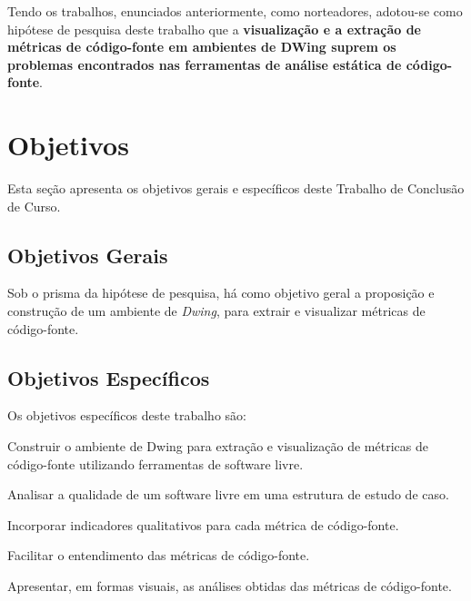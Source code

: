 Tendo os trabalhos, enunciados anteriormente, como norteadores, adotou-se como 
hipótese de pesquisa deste trabalho que a \textbf{visualização
e a extração de métricas de código-fonte em ambientes de DWing suprem 
os problemas encontrados nas ferramentas de análise estática de código-fonte}.








\section{Objetivos}

Esta seção apresenta os objetivos gerais e específicos deste Trabalho de 
Conclusão de Curso.

\subsection{Objetivos Gerais}
Sob o prisma da hipótese de pesquisa, há como objetivo geral a proposição e 
construção  de um ambiente de \textit{Dwing}, para extrair e visualizar métricas
 de código-fonte.



\subsection{Objetivos Específicos}

Os objetivos específicos deste trabalho são:


\begin{objectives}
	\item Construir o ambiente de Dwing para extração e visualização de métricas 
	de código-fonte utilizando ferramentas de software livre.
	
	\item Analisar a qualidade de um software livre em uma estrutura de estudo 
	de caso.
  
	\item Incorporar indicadores qualitativos para cada métrica de código-fonte.
	
	\item Facilitar o entendimento das métricas de código-fonte.
	
	\item Apresentar, em formas visuais, as análises obtidas das métricas de 
	código-fonte.
	
    \end{objectives}
	


